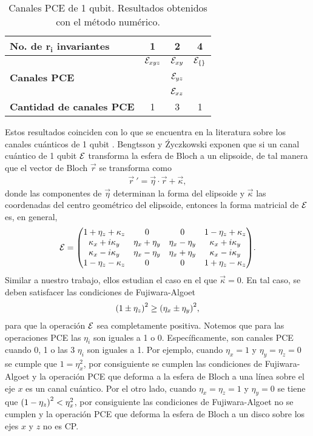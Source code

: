 \begin{table}
\centering
\begin{tabular}{|l|c|c|c|}
\hline
\textbf{No. de $\mathbf{r_i}$ invariantes} & \textbf{1} & \textbf{2} &  \textbf{4}\\
\hline 
 & $\mathcal{E}_{xyz}$ & $\mathcal{E}_{xy}$ & $\mathcal{E}_{\{\}}$ \\ 
\textbf{Canales PCE} &  & $\mathcal{E}_{yz}$ &  \\ 
 & & $\mathcal{E}_{xz}$ &  \\ 
\hline
\textbf{Cantidad de canales PCE} & 1 & 3 & 1 \\
\hline
\end{tabular} 
\caption{Canales PCE de 1 qubit. Resultados
obtenidos con el método numérico.}
\label{c:resultados-1q}
\end{table}

Estos resultados coinciden con lo que se encuentra 
en la literatura sobre los canales cuánticos 
de 1 qubit \cite{bengtsson_zyczkowski_2017}
\cite{nielsen_chuang_2011}. Bengtsson y 
Źyczkowski exponen que si un canal cuántico de 1 qubit
$\mathcal{E}$ transforma la esfera de Bloch a un elipsoide, de
tal manera que el vector de Bloch $\vec{r}$ 
se transforma como 
\begin{align}
\vec{r}\ '=\vec{\eta}\cdot\vec{r}+\vec{\kappa},
\end{align}
donde las componentes de $\vec{\eta}$ determinan 
la forma del elipsoide y $\vec{\kappa}$ las coordenadas del 
centro geométrico del elipsoide, entonces
la forma matricial de $\mathcal{E}$ es, en general,
\begin{align}
\E =
\mqty(
1+\eta_z+\kappa_z & 0 & 0 & 1-\eta_z+\kappa_z \\
\kappa_x+i\kappa_y & \eta_x+\eta_y & \eta_x-\eta_y & \kappa_x+i\kappa_y\\
\kappa_x-i\kappa_y & \eta_x-\eta_y & \eta_x+\eta_y & \kappa_x-i\kappa_y\\
1-\eta_z-\kappa_z & 0 & 0 & 1+\eta_z-\kappa_z
).
\end{align}
Similar a nuestro trabajo, ellos estudian el caso en el que 
$\vec{\kappa}=0$. En tal caso, se deben satisfacer 
las condiciones de Fujiwara-Algoet
\begin{align}
\qty(1\pm\eta_z)^2\geq\qty(\eta_x\pm\eta_y)^2,
\label{eq:fujiwara-algoet}
\end{align}
para que la operación $\mathcal{E}$ sea completamente positiva. Notemos
que para las operaciones PCE las $\eta_i$ son iguales a 1 o 0. 
Específicamente, son canales PCE cuando 0, 1 o las 3 $\eta_i$
son iguales a 1. Por ejemplo, cuando $\eta_x=1$ y $\eta_y=\eta_z=0$ 
se cumple que $1=\eta_x^2$, por consiguiente se cumplen las condiciones 
de Fujiwara-Algoet y la operación PCE que deforma  a la esfera de 
Bloch a una línea sobre el eje $x$ es un canal cuántico. Por el otro lado, 
cuando $\eta_x=\eta_z=1$ y $\eta_y=0$ se tiene que 
$\qty(1-\eta_z)^2<\eta_x^2$, por consiguiente las condiciones
de Fujiwara-Algoet no se cumplen y la operación PCE 
que deforma la esfera de Bloch a un disco sobre los ejes 
$x$ y $z$ no es CP.

